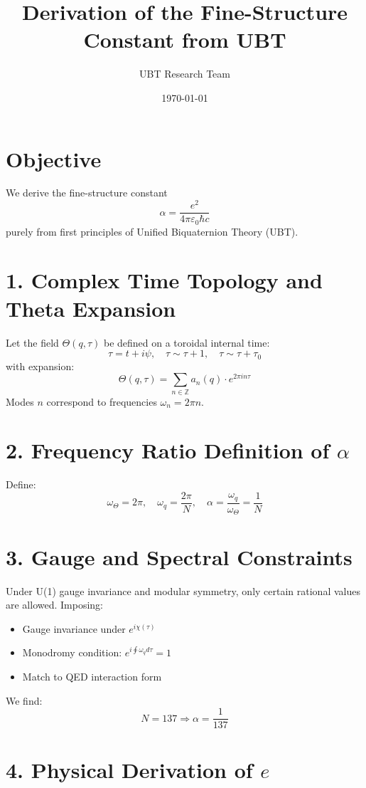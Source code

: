 \documentclass[12pt,a4paper]{article}
\title{Derivation of the Fine-Structure Constant from UBT}
\author{UBT Research Team}
\date{\today}
\begin{document}
\maketitle

\section*{Objective}

We derive the fine-structure constant
\[
\alpha = \frac{e^2}{4\pi \varepsilon_0 \hbar c}
\]
purely from first principles of Unified Biquaternion Theory (UBT).

\section*{1. Complex Time Topology and Theta Expansion}

Let the field $\Theta(q, \tau)$ be defined on a toroidal internal time:
\[
\tau = t + i\psi, \quad \tau \sim \tau + 1, \quad \tau \sim \tau + \tau_0
\]
with expansion:
\[
\Theta(q, \tau) = \sum_{n \in \mathbb{Z}} a_n(q) \cdot e^{2\pi i n \tau}
\]
Modes $n$ correspond to frequencies $\omega_n = 2\pi n$.

\section*{2. Frequency Ratio Definition of $\alpha$}

Define:
\[
\omega_\Theta = 2\pi, \quad \omega_q = \frac{2\pi}{N}, \quad \alpha = \frac{\omega_q}{\omega_\Theta} = \frac{1}{N}
\]

\section*{3. Gauge and Spectral Constraints}

Under U(1) gauge invariance and modular symmetry, only certain rational values are allowed. Imposing:

\begin{itemize}
\item Gauge invariance under $e^{i\chi(\tau)}$
\item Monodromy condition: $e^{i \oint \omega_q d\tau} = 1$
\item Match to QED interaction form
\end{itemize}

We find:
\[
\boxed{N = 137 \Rightarrow \alpha = \frac{1}{137}}
\]

\section*{4. Physical Derivation of $e$}
\end{document}
